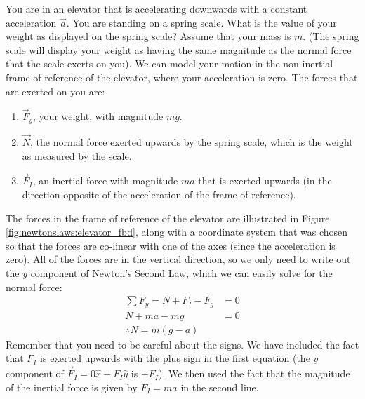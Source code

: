 \begin{example}{You are in an elevator that is accelerating downwards with a constant acceleration $\vec a$. You are standing on a spring scale. What is the value of your weight as displayed on the spring scale? Assume that your mass is $m$. (The spring scale will display your weight as having the same magnitude as the normal force that the scale exerts on you). }
We can model your motion in the non-inertial frame of reference of the elevator, where your acceleration is zero. The forces that are exerted on you are:
\begin{enumerate}
\item $\vec F_g$, your weight, with magnitude $mg$.
\item $\vec N$, the normal force exerted upwards by the spring scale, which is the weight as measured by the scale.
\item $\vec F_I$, an inertial force with magnitude $ma$ that is exerted upwards (in the direction opposite of the acceleration of the frame of reference).
\end{enumerate}
The forces in the frame of reference of the elevator are illustrated in Figure \ref{fig:newtonslaws:elevator_fbd}, along with a coordinate system that was chosen so that the forces are co-linear with one of the axes (since the acceleration is zero).
All of the forces are in the vertical direction, so we only need to write out the $y$ component of Newton's Second Law, which we can easily solve for the normal force:
\begin{align*}
\sum F_y = N+F_I-F_g &=0\\
N + ma -mg &=0\\
\therefore N=m(g-a)
\end{align*}
Remember that you need to be careful about the signs. We have included the fact that $F_I$ is exerted upwards with the plus sign in the first equation (the $y$ component of $\vec F_I=0\hat x+F_I\hat y$ is $+F_I$). We then used the fact that the magnitude of the inertial force is given by $F_I=ma$ in the second line.


\end{example}
